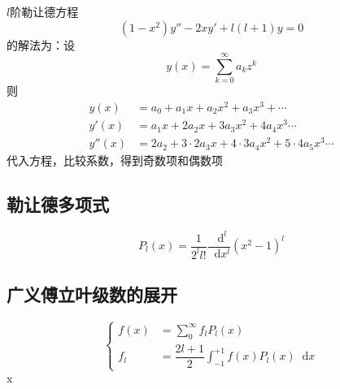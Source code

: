 \documentclass{article}
\newcommand*{\md}{\mathop{}\!\mathrm{d}}
\begin{document}
$l$阶勒让德方程
\begin{equation*}
  \label{eq:1}
  \left( 1 - x^{2} \right) y'' - 2 x y' + l \left( l + 1 \right) y = 0
\end{equation*}
的解法为：设
\begin{equation*}
  \label{eq:2}
  y \left( x \right) = \sum\limits_{k = 0}^{\infty} a_{k} z^{k}
\end{equation*}
则
\begin{equation*}
  \begin{aligned}
    y \left( x\right) &= a_{0} + a_{1}x + a_{2}x^{2} + a_{3}x^{3} + \cdots \\
    y' \left( x \right) &= a_{1}x + 2 a_{2}x + 3 a_{3}x^{2} + 4 a_{4}x^{3} \cdots \\
    y'' \left( x \right) &= 2 a_{2} + 3 \cdot 2  a_{3}x + 4 \cdot 3 a_{4}x^{2} + 5 \cdot 4 a_{5} x^{3} \cdots
  \end{aligned}
\end{equation*}
代入方程，比较系数，得到奇数项和偶数项


\subsection{勒让德多项式}

\begin{equation*}
  \label{eq:6}
  P_{l} \left( x \right) = \dfrac{1}{2^{l} l!} \dfrac{\md^{l}}{\md x^{l}} \left( x^{2} - 1 \right)^{l}
\end{equation*}

\subsection{广义傅立叶级数的展开}

\begin{equation*}
  \label{eq:7}
  \left\{
    \begin{aligned}
      f(x) &= \sum\limits_{0}^{\infty} f_{l} P_{l}(x) \\
      f_{l} &= \dfrac{2l+1}{2} \int_{-1}^{+1} f(x) P_{l}(x) \md x
    \end{aligned}
  \right.
\end{equation*}x
\end{document}
